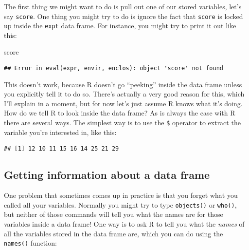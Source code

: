 \documentclass[
]{book}
\newenvironment{Shaded}{\begin{snugshade}}{\end{snugshade}}
\newcommand{\NormalTok}[1]{#1}
\newcommand{\SpecialCharTok}[1]{\textcolor[rgb]{0.00,0.00,0.00}{#1}}
\begin{document}
The first thing we might want to do is pull out one of our stored variables, let's say \texttt{score}. One thing you might try to do is ignore the fact that \texttt{score} is locked up inside the \texttt{expt} data frame. For instance, you might try to print it out like this:

\begin{Shaded}
\begin{Highlighting}[]
\NormalTok{score}
\end{Highlighting}
\end{Shaded}

\begin{verbatim}
## Error in eval(expr, envir, enclos): object 'score' not found
\end{verbatim}

This doesn't work, because R doesn't go ``peeking'' inside the data frame unless you explicitly tell it to do so. There's actually a very good reason for this, which I'll explain in a moment, but for now let's just assume R knows what it's doing. How do we tell R to look inside the data frame? As is always the case with R there are several ways. The simplest way is to use the \texttt{\$} operator to extract the variable you're interested in, like this:

\begin{Shaded}
\end{Shaded}

\begin{verbatim}
## [1] 12 10 11 15 16 14 25 21 29
\end{verbatim}

\hypertarget{getting-information-about-a-data-frame}{%
\subsection{Getting information about a data frame}\label{getting-information-about-a-data-frame}}

One problem that sometimes comes up in practice is that you forget what you called all your variables. Normally you might try to type \texttt{objects()} or \texttt{who()}, but neither of those commands will tell you what the names are for those variables inside a data frame! One way is to ask R to tell you what the \emph{names} of all the variables stored in the data frame are, which you can do using the \texttt{names()} function:
\end{document}
